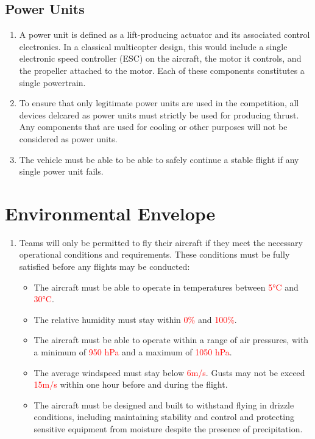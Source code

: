 \documentclass{article}
\begin{document}
\subsection{Power Units}
\begin{enumerate}
  \item A power unit is defined as a lift-producing actuator and its associated control electronics. In a classical multicopter design, this would include a single electronic speed controller (ESC) on the aircraft, the motor it controls, and the propeller attached to the motor. Each of these components constitutes a single powertrain. 
  \item To ensure that only legitimate power units are used in the competition, all devices delcared as power units must strictly be used for producing thrust. Any components that are used for cooling or other purposes will not be considered as power units.
  \item The vehicle must be able to be able to safely continue a stable flight if any single power unit fails.  
\end{enumerate}



\section{Environmental Envelope}
\begin{enumerate}
  \item Teams will only be permitted to fly their aircraft if they meet the necessary operational conditions and requirements. These conditions must be fully satisfied before any flights may be conducted:
\begin {itemize}
  \item The aircraft must be able to operate in temperatures between \textcolor{red}{5°C} and \textcolor{red}{30°C}.
  \item The relative humidity must stay within \textcolor{red}{0\%} and \textcolor{red}{100\%}. 
  \item The aircraft must be able to operate within a range of air pressures, with a minimum of \textcolor{red}{950 hPa} and a maximum of \textcolor{red}{1050 hPa}.
  \item The average windspeed must stay below \textcolor{red}{6m/s}. Gusts may not be exceed \textcolor{red}{15m/s} within one hour before and during the flight.
  \item The aircraft must be designed and built to withstand flying in drizzle conditions, including maintaining stability and control and protecting sensitive equipment from moisture despite the presence of precipitation.
  
\end {itemize}
\end{enumerate}
\end{document}
